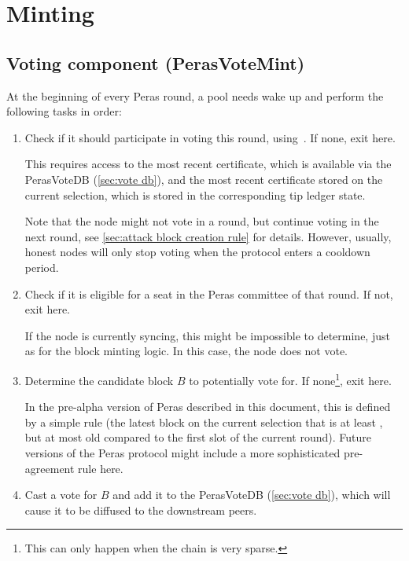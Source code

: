\section{Minting}\label{sec:minting}

\subsection{Voting component (PerasVoteMint)}\label{sec:vote mint}

At the beginning of every Peras round, a pool needs wake up and perform the following tasks in order:
\begin{enumerate}
\item
  Check if it should participate in voting this round, using~\cite[Rules for voting in a round]{peras-cip}.
  If none, exit here.

  This requires access to the most recent certificate, which is available via the PerasVoteDB (\cref{sec:vote db}), and the most recent certificate stored on the current selection, which is stored in the corresponding tip ledger state.

  Note that the node might not vote in a round, but continue voting in the next round, see \cref{sec:attack block creation rule} for details.
  However, usually, honest nodes will only stop voting when the protocol enters a cooldown period.
\item
  Check if it is eligible for a seat in the Peras committee of that round.
  If not, exit here.

  If the node is currently syncing, this might be impossible to determine, just as for the block minting logic.
  In this case, the node does not vote.
\item
  Determine the candidate block $B$ to potentially vote for.
  If none\footnote{This can only happen when the chain is very sparse.}, exit here.

  In the pre-alpha version of Peras described in this document, this is defined by a simple rule (the latest block on the current selection that is at least \perasBlockMinSlots{}, but at most \perasBlockMaxSlots{} old compared to the first slot of the current round).
  Future versions of the Peras protocol might include a more sophisticated pre-agreement rule here.
\item
  Cast a vote for $B$ and add it to the PerasVoteDB (\cref{sec:vote db}), which will cause it to be diffused to the downstream peers.
\end{enumerate}

